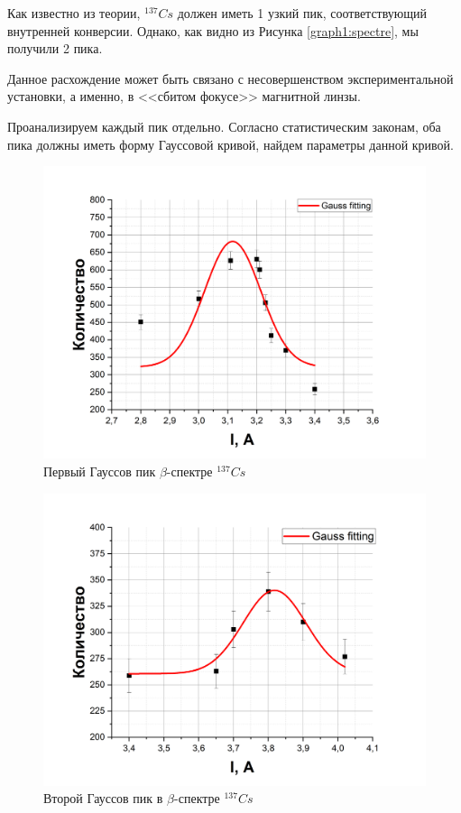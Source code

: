 \documentclass[a4paper,12pt]{article}
\begin{document}
\pagebreak

Как известно из теории, $^{137} Cs$ должен иметь 1 узкий пик, соответствующий внутренней конверсии. Однако, как видно из Рисунка \ref{graph1:spectre}, мы получили 2 пика. 

Данное расхождение может быть связано с несовершенством экспериментальной установки, а именно, в <<сбитом фокусе>> магнитной линзы.

Проанализируем каждый пик отдельно. Согласно статистическим законам, оба пика должны иметь форму Гауссовой кривой, найдем параметры данной кривой.

\begin{figure}[h!]
	\centering
	\includegraphics[width=0.75\linewidth]{graph2 (Gauss_1)}
	\caption{Первый Гауссов пик $\beta$-спектре $^{137}Cs$}
	\label{graph2:Gauss_1}
\end{figure}

\begin{figure}[h!]
	\centering
	\includegraphics[width=0.75\linewidth]{graph3 (Gauss_2)}
	\caption{Второй Гауссов пик в $\beta$-спектре $^{137}Cs$}
	\label{graph1:Gauss_2}
\end{figure}
\end{document}
